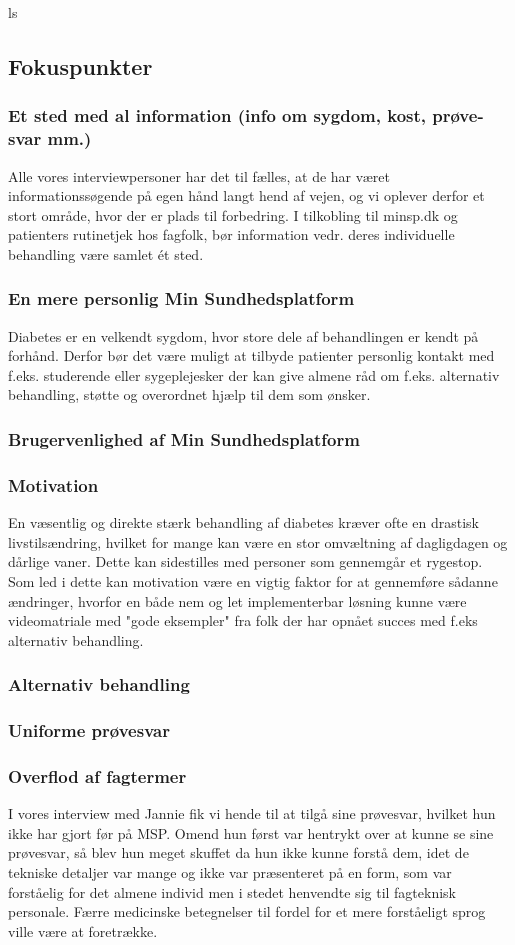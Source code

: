 ls
\subsection{Fokuspunkter}
\subsubsection{Et sted med al information (info om sygdom, kost, prøve-svar mm.)}
Alle vores interviewpersoner har det til fælles, at de har været informationssøgende på egen hånd langt hend af vejen, og vi oplever derfor et stort område, hvor der er plads til forbedring. I tilkobling til minsp.dk og patienters rutinetjek hos fagfolk, bør information vedr. deres individuelle behandling være samlet ét sted.
\subsubsection{En mere personlig Min Sundhedsplatform}
Diabetes er en velkendt sygdom, hvor store dele af behandlingen er kendt på forhånd. Derfor bør det være muligt at tilbyde patienter personlig kontakt med f.eks. studerende eller sygeplejesker der kan give almene råd om f.eks. alternativ behandling, støtte og overordnet hjælp til dem som ønsker.
\subsubsection{Brugervenlighed af Min Sundhedsplatform}
\subsubsection{Motivation}
En væsentlig og direkte stærk behandling af diabetes kræver ofte en drastisk livstilsændring, hvilket for mange kan være en stor omvæltning af dagligdagen og dårlige vaner. Dette kan sidestilles med personer som gennemgår et rygestop. Som led i dette kan motivation være en vigtig faktor for at gennemføre sådanne ændringer, hvorfor en både nem og let implementerbar løsning kunne være videomatriale med "gode eksempler" fra folk der har opnået succes med f.eks alternativ behandling.
\subsubsection{Alternativ behandling}
\subsubsection{Uniforme prøvesvar}
\subsubsection{Overflod af fagtermer}
I vores interview med Jannie fik vi hende til at tilgå sine prøvesvar, hvilket hun ikke har gjort før på MSP. Omend hun først var hentrykt over at kunne se sine prøvesvar, så blev hun meget skuffet da hun ikke kunne forstå dem, idet de tekniske detaljer var mange og ikke var præsenteret på en form, som var forståelig for det almene individ men i stedet henvendte sig til fagteknisk personale. Færre medicinske betegnelser til fordel for et mere forståeligt sprog ville være at foretrække. 

